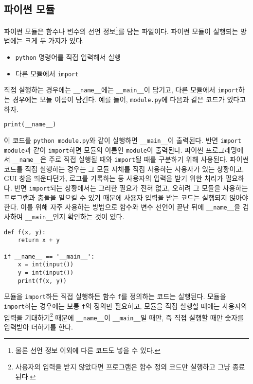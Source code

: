 \documentclass{scrartcl}
\begin{document}
\subsection{파이썬 모듈}
파이썬 모듈은 함수나 변수의 선언 정보\footnote{물론 선언 정보 이외에 다른 코드도 넣을 수 있다.}를 담는 파일이다. 파이썬 모듈이 실행되는 방법에는 크게 두 가지가 있다.
\begin{itemize}
  \item \texttt{python} 명령어를 직접 입력해서 실행
  \item 다른 모듈에서 \texttt{import}
\end{itemize}
직접 실행하는 경우에는 \texttt{\_\_name\_\_}에는 \texttt{\_\_main\_\_}이 담기고, 다른 모듈에서 \texttt{import}하는 경우에는 모듈 이름이 담긴다. 예를 들어, \texttt{module.py}에 다음과 같은 코드가 있다고 하자.
\begin{lstlisting}
print(__name__)
\end{lstlisting}
이 코드를 \texttt{python module.py}와 같이 실행하면 \texttt{\_\_main\_\_}이 출력된다. 반면 \texttt{import module}과 같이 \texttt{import}하면 모듈의 이름인 \texttt{module}이 출력된다. 파이썬 프로그래밍에서 \texttt{\_\_name\_\_}은 주로 직접 실행될 때와 \texttt{import}될 때를 구분하기 위해 사용된다. 파이썬 코드를 직접 실행하는 경우는 그 모듈 자체를 직접 사용하는 사용자가 있는 상황이고, GUI 창을 띄운다던가, 로그를 기록하는 등 사용자의 입력을 받기 위한 처리가 필요하다. 반면 \texttt{import}되는 상황에서는 그러한 필요가 전혀 없고, 오히려 그 모듈을 사용하는 프로그램과 충돌을 일으킬 수 있기 때문에 사용자 입력을 받는 코드는 실행되지 않아야 한다. 이를 위해 자주 사용하는 방법으로 함수와 변수 선언이 끝난 뒤에 \texttt{\_\_name\_\_}을 검사하여 \texttt{\_\_main\_\_}인지 확인하는 것이 있다.
\begin{lstlisting}
def f(x, y):
    return x + y

if __name__ == '__main__':
    x = int(input())
    y = int(input())
    print(f(x, y))
\end{lstlisting}
모듈을 \texttt{import}하든 직접 실행하든 함수 \texttt{f}를 정의하는 코드는 실행된다. 모듈을 \texttt{import}하는 경우에는 보통 \texttt{f}의 정의만 필요하고, 모듈을 직접 실행할 때에는 사용자의 입력을 기대하기\footnote{사용자의 입력을 받지 않았다면 프로그램은 함수 정의 코드만 실행하고 그냥 종료된다.} 때문에 \texttt{\_\_name\_\_}이 \texttt{\_\_main\_\_}일 때만, 즉 직접 실행할 때만 숫자를 입력받아 더하기를 한다.
\end{document}
